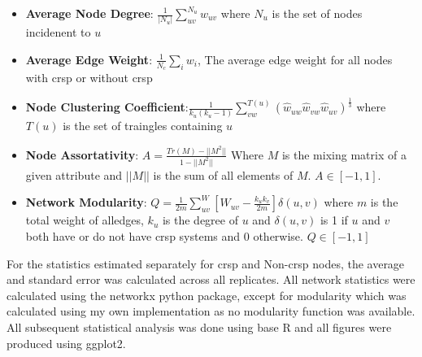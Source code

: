     \begin{itemize}
        \item \textbf{Average Node Degree}: $\frac{1}{|N_u|}\sum_{uv}^{N_u} w_{uv}$ where $N_u$ is the set of nodes incidenent to $u$
        \item \textbf{Average Edge Weight}: $\frac{1}{N_c}\sum_i w_i$, The average edge weight for all nodes with \ac{crsp} or without \ac{crsp}
        \item \textbf{Node Clustering Coefficient}:$\frac{1}{k_u(k_u-1)} \sum_{vw}^{T(u)} (\hat{w}_{uw} \hat{w}_{vw} \hat{w}_{uv})^{\frac{1}{3}}$ where $T(u)$ is the set of traingles containing $u$ \citep{clustering}
        \item \textbf{Node Assortativity}: $A = \frac{Tr(M)-||M^2||}{1-||M^2||}$ Where $M$ is the mixing matrix of a given attribute and $||M||$ is the sum of all elements of $M$. $A \in [-1,1]$.\citep{newmanmix}
        \item \textbf{Network Modularity}: $Q=\frac{1}{2m}\sum_{uv}^W [W_{uv} - \frac{k_u k_v}{2m}]\delta(u,v)$ where $m$ is the total weight of alledges, $k_u$ is the degree of $u$ and $\delta(u,v)$ is 1 if $u$ and $v$ both have or do not have \ac{crsp} systems and 0 otherwise. $Q \in [-1,1]$ \citep{modularity}
    \end{itemize}
For the statistics estimated separately for \ac{crsp} and Non-\ac{crsp} nodes, the average and standard error was calculated across all replicates.
All network statistics were calculated using the networkx python package, except for modularity which was calculated using my own implementation as no modularity function was available.
All subsequent statistical analysis was done using base R and all figures were produced using ggplot2.

